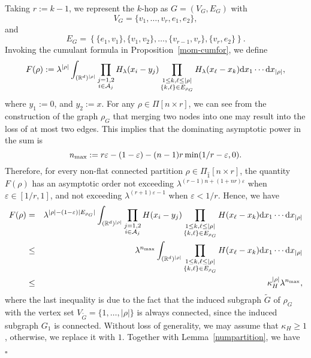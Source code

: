\documentclass[12pt]{article}
\newcommand{\R}{\mathbb{R}}
\newenvironment{Proof}{\removelastskip\par\medskip
\noindent{\em Proof.} \rm}{\penalty-20\null\hfill$\square$\par\medbreak}
\numberwithin{equation}{section}
\begin{document}
\begin{Proof}
 Taking $r:=k-1$, we represent the $k$-hop as $G=(V_G,E_G)$ with 
$$V_G=\{v_1, \ldots ,v_r,e_1,e_2\},$$ and 
$$E_G=\left\{\{e_1,v_1\},\{v_1,v_2\}, \ldots ,\{v_{r-1},v_r\},\{v_r,e_2\}\right\}.$$
Invoking the cumulant formula in Proposition~\ref{mom-cumfor}, we define 
\begin{equation}
\nonumber
F(\rho):=\lambda^{|\rho|}\int_{(\R^d)^{|\rho|}}
\prod_{\substack{ j=1 , 2
  \\ i\in {\cal A}_j}
}H_{\lambda}(x_i-y_j)
 \prod_{\substack{1\leq k , \ell \le|\rho|\\\{ k , \ell \}\in E_{\rho_G}}}H_{\lambda}(x_\ell-x_k)\mathrm{d}x_1\cdots\mathrm{d}x_{|\rho|},
\end{equation}
where $y_1:=0$, and $y_2:=x$.
For any $\rho\in\Pi[n\times r]$, we can see from the construction of the
graph $\rho_G$ that merging two nodes into one may
result into the loss of at most two edges.
This implies that the dominating asymptotic power in the sum is
\begin{equation}
\nonumber
n_{{\rm max}}:= r \varepsilon - ( 1 - \varepsilon ) - (n-1) r \min (  1/r  - \varepsilon ,0). 
\end{equation}
Therefore, for every non-flat connected partition
$\rho\in\Pi_{\widehat{1}}[n\times r]$, the quantity $F(\rho)$ has an asymptotic order not exceeding $\lambda^{
  (r-1)n + (1+nr)\varepsilon }$ when $\varepsilon \in [1/r ,1]$, and not exceeding $\lambda^{(r+1)\varepsilon -1 }$ when $\varepsilon < 1/r $. Hence, we have
\begin{eqnarray*}
  F(\rho)&=&\lambda^{|\rho|- ( 1 - \varepsilon ) |E_{\rho_G}|}\int_{(\R^d)^{|\rho|}}\prod_{\substack{j=1,2\\i\in {\cal A}_j}}
  H(x_i-y_j)
  \prod_{\substack{1\leq k , \ell \le|\rho|\\\{  k , \ell \}\in E_{\rho_G}}}H(x_\ell-x_k)\mathrm{d}x_1\cdots\mathrm{d}x_{|\rho|}\nonumber\\
&\leq &\lambda^{n_{{\rm max}}}\int_{(\R^d)^{|\rho|}}\prod_{\substack{1\leq k , \ell \le|\rho|\\\{ k , \ell \}\in E_{\rho_G}}}H(x_\ell-x_k)\mathrm{d}x_1\cdots\mathrm{d}x_{|\rho|}\nonumber\\
&\leq & \kappa_H^{|\rho|} \lambda^{n_{{\rm max}}},
\end{eqnarray*}
where the last inequality is due to the fact that the induced subgraph $\widetilde{G}$ of $\rho_G$ with the vertex set $V_{\widetilde{G}} = \{1, \ldots ,|\rho|\}$ is always connected, since the induced subgraph $G_1$ is connected. Without loss of generality, we may assume that $\kappa_H\geq 1$, otherwise, we replace it with $1$. Together with Lemma~\ref{numpartition}, we have 

\end{Proof}
\end{document}
